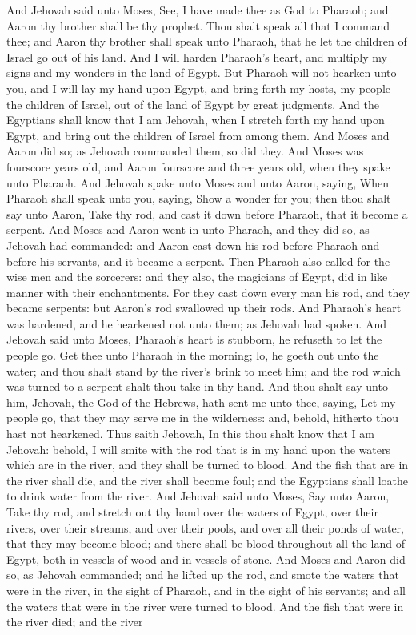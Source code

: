And Jehovah said unto Moses, See, I have made thee as God to Pharaoh; and Aaron thy brother shall be thy prophet. Thou shalt speak all that I command thee; and Aaron thy brother shall speak unto Pharaoh, that he let the children of Israel go out of his land. And I will harden Pharaoh’s heart, and multiply my signs and my wonders in the land of Egypt. But Pharaoh will not hearken unto you, and I will lay my hand upon Egypt, and bring forth my hosts, my people the children of Israel, out of the land of Egypt by great judgments. And the Egyptians shall know that I am Jehovah, when I stretch forth my hand upon Egypt, and bring out the children of Israel from among them. And Moses and Aaron did so; as Jehovah commanded them, so did they. And Moses was fourscore years old, and Aaron fourscore and three years old, when they spake unto Pharaoh.  And Jehovah spake unto Moses and unto Aaron, saying, When Pharaoh shall speak unto you, saying, Show a wonder for you; then thou shalt say unto Aaron, Take thy rod, and cast it down before Pharaoh, that it become a serpent. And Moses and Aaron went in unto Pharaoh, and they did so, as Jehovah had commanded: and Aaron cast down his rod before Pharaoh and before his servants, and it became a serpent. Then Pharaoh also called for the wise men and the sorcerers: and they also, the magicians of Egypt, did in like manner with their enchantments. For they cast down every man his rod, and they became serpents: but Aaron’s rod swallowed up their rods. And Pharaoh’s heart was hardened, and he hearkened not unto them; as Jehovah had spoken.  And Jehovah said unto Moses, Pharaoh’s heart is stubborn, he refuseth to let the people go. Get thee unto Pharaoh in the morning; lo, he goeth out unto the water; and thou shalt stand by the river’s brink to meet him; and the rod which was turned to a serpent shalt thou take in thy hand. And thou shalt say unto him, Jehovah, the God of the Hebrews, hath sent me unto thee, saying, Let my people go, that they may serve me in the wilderness: and, behold, hitherto thou hast not hearkened. Thus saith Jehovah, In this thou shalt know that I am Jehovah: behold, I will smite with the rod that is in my hand upon the waters which are in the river, and they shall be turned to blood. And the fish that are in the river shall die, and the river shall become foul; and the Egyptians shall loathe to drink water from the river. And Jehovah said unto Moses, Say unto Aaron, Take thy rod, and stretch out thy hand over the waters of Egypt, over their rivers, over their streams, and over their pools, and over all their ponds of water, that they may become blood; and there shall be blood throughout all the land of Egypt, both in vessels of wood and in vessels of stone.  And Moses and Aaron did so, as Jehovah commanded; and he lifted up the rod, and smote the waters that were in the river, in the sight of Pharaoh, and in the sight of his servants; and all the waters that were in the river were turned to blood. And the fish that were in the river died; and the river 
